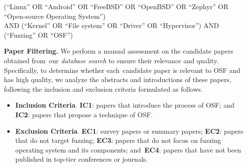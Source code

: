 \begin{tcolorbox}[size=fbox, opacityfill=0.15]
\small
  (``Linux'' OR ``Android'' OR ``FreeBSD'' OR ``OpenBSD'' OR ``Zephyr'' OR ``Open-source Operating System'')\\
 AND  (``Kernel'' OR ``File system'' OR ``Driver'' OR ``Hypervisor'')  AND  (``Fuzzing'' OR ``OSF'')
\end{tcolorbox}


\textbf{Paper Filtering.} 
We perform a manual assessment on the  candidate papers obtained from~our \emph{database search} to ensure their relevance and quality. Specifically, to determine whether each~candidate paper is relevant to OSF and has high quality, we analyze the abstracts and introductions of these papers, following the inclusion and exclusion criteria formulated as follows.

\begin{itemize}[leftmargin=*]
  \item \textbf{Inclusion Criteria}. \textbf{IC1}: papers that introduce the process of OSF; and \textbf{IC2}: papers that propose a technique of OSF.
  \item \textbf{Exclusion Criteria}. \textbf{EC1}: survey papers or summary papers; \textbf{EC2}: papers that do not target fuzzing; \textbf{EC3}: papers that do not focus on fuzzing operating system and its components; and~\textbf{EC4}: papers that have not been published in top-tier conferences or journals.
\end{itemize}

